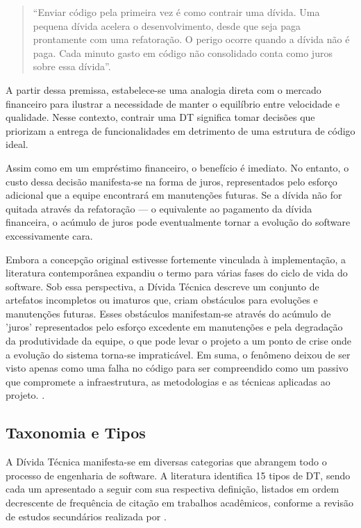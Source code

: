 \documentclass[12pt,openright,oneside,a4paper,brazil]{abntex2}
\begin{document}
\begin{quote}
    ``Enviar código pela primeira vez é como contrair uma dívida. Uma pequena dívida acelera o desenvolvimento, desde que seja paga prontamente com uma refatoração. O perigo ocorre quando a dívida não é paga. Cada minuto gasto em código não consolidado conta como juros sobre essa dívida''.
\end{quote}

A partir dessa premissa, estabelece-se uma analogia direta com o mercado financeiro para ilustrar a necessidade de manter o equilíbrio entre velocidade e qualidade. Nesse contexto, contrair uma DT significa tomar decisões que priorizam a entrega de funcionalidades em detrimento de uma estrutura de código ideal.

Assim como em um empréstimo financeiro, o benefício é imediato. No entanto, o custo dessa decisão manifesta-se na forma de juros, representados pelo esforço adicional que a equipe encontrará em manutenções futuras. Se a dívida não for quitada através da refatoração — o equivalente ao pagamento da dívida financeira, o acúmulo de juros pode eventualmente tornar a evolução do software excessivamente cara.

Embora a concepção original estivesse fortemente vinculada à implementação, a literatura contemporânea expandiu o termo para várias fases do ciclo de vida do software. Sob essa perspectiva, a Dívida Técnica descreve um conjunto de artefatos incompletos ou imaturos que, criam obstáculos para evoluções e manutenções futuras. Esses obstáculos manifestam-se através do acúmulo de 'juros' representados pelo esforço excedente em manutenções e pela degradação da produtividade da equipe, o que pode levar o projeto a um ponto de crise onde a evolução do sistema torna-se impraticável. Em suma, o fenômeno deixou de ser visto apenas como uma falha no código para ser compreendido como um passivo que compromete a infraestrutura, as metodologias e as técnicas aplicadas ao projeto. \cite{BIAZOTTO2024107375,RIOS2018117}.

\subsection{Taxonomia e Tipos}

A Dívida Técnica manifesta-se em diversas categorias que abrangem todo o processo de engenharia de software. A literatura identifica 15 tipos de DT, sendo cada um apresentado a seguir com sua respectiva definição, listados em ordem decrescente de frequência de citação em trabalhos acadêmicos, conforme a revisão de estudos secundários realizada por \cite{RIOS2018117}.
\end{document}
